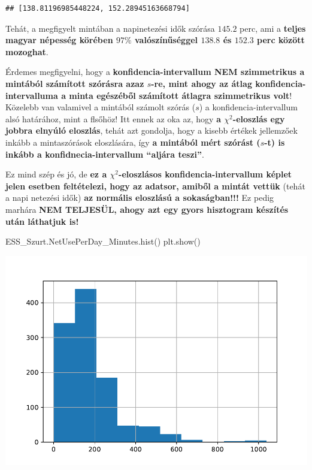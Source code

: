 \documentclass[
]{book}
\newenvironment{Shaded}{\begin{snugshade}}{\end{snugshade}}
\newcommand{\NormalTok}[1]{#1}
\begin{document}
\begin{verbatim}
## [138.81196985448224, 152.28945163668794]
\end{verbatim}

Tehát, a megfigyelt mintában a napinetezési idők szórása \(145.2\) perc, ami a \textbf{teljes magyar népesség körében \(97\%\) valószínűséggel \(138.8\) és \(152.3\) perc között mozoghat}.

Érdemes megfigyelni, hogy a \textbf{konfidencia-intervallum NEM szimmetrikus a mintából számított szórásra azaz \(s\)-re, mint ahogy az átlag konfidencia-intervalluma a minta egészéből számított átlagra szimmetrikus volt}! Közelebb van valamivel a mintából számolt szórás (\(s\)) a konfidencia-intervallum alsó határához, mint a flsőhöz! Itt ennek az oka az, hogy \textbf{a \(\chi^2\)-eloszlás egy jobbra elnyúló eloszlás}, tehát azt gondolja, hogy a kisebb értékek jellemzőek inkább a mintaszórások eloszlására, így \textbf{a mintából mért szórást (\(s\)-t) is inkább a konfidnecia-intervallum ``aljára teszi''}.

Ez mind szép és jó, de \textbf{ez a \(\chi^2\)-eloszlásos konfidencia-intervallum képlet jelen esetben feltételezi, hogy az adatsor, amiből a mintát vettük} (tehát a napi netezési idők) \textbf{az normális eloszlású a sokaságban!!!} Ez pedig marhára \textbf{NEM TELJESÜL, ahogy azt egy gyors hisztogram készítés után láthatjuk is!}

\begin{Shaded}
\begin{Highlighting}[]
\NormalTok{ESS\_Szurt.NetUsePerDay\_Minutes.hist()}
\NormalTok{plt.show()}
\end{Highlighting}
\end{Shaded}

\includegraphics{_main_files/figure-latex/unnamed-chunk-312-19.pdf}
\end{document}
